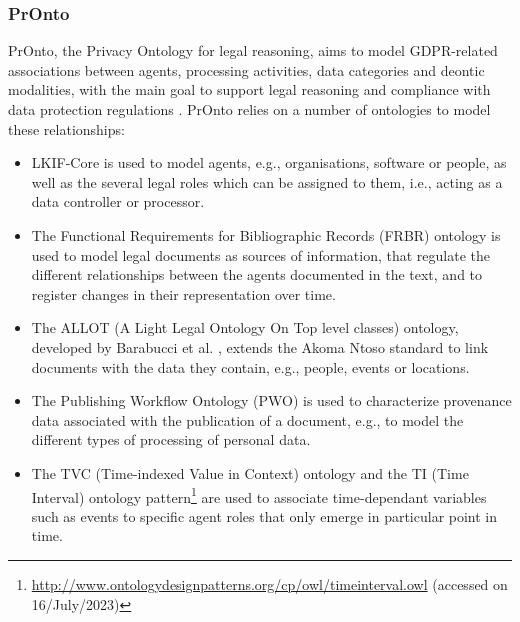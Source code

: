 \subsubsection{PrOnto}
\label{sec:pronto}

PrOnto, the Privacy Ontology for legal reasoning, aims to model GDPR-related associations between agents, processing activities, data categories and deontic modalities, with the main goal to support legal reasoning and compliance with data protection regulations \citep{ko_pronto_2018}.
PrOnto relies on a number of ontologies to model these relationships:
\begin{itemize}
    \item LKIF-Core \citep{hoekstra_lkif_2007} is used to model agents, e.g., organisations, software or people, as well as the several legal roles which can be assigned to them, i.e., acting as a data controller or processor.
    \item The Functional Requirements for Bibliographic Records (FRBR) ontology \citep{byrum_functional_2009} is used to model legal documents as sources of information, that regulate the different relationships between the agents documented in the text, and to register changes in their representation over time. %
    \item The ALLOT (A Light Legal Ontology On Top level classes) ontology, developed by Barabucci et al. \citep{barabucci_managing_2010}, extends the Akoma Ntoso standard \citep{palmirani_akoma-ntoso_2011} to link documents with the data they contain, e.g., people, events or locations.
    \item The Publishing Workflow Ontology (PWO) \citep{gangemi_publishing_2017} is used to characterize provenance data associated with the publication of a document, e.g., to model the different types of processing of personal data.
    \item The TVC (Time-indexed Value in Context) ontology \citep{peroni_semantic_2014} and the TI (Time Interval) ontology pattern\footnote{\url{http://www.ontologydesignpatterns.org/cp/owl/timeinterval.owl} (accessed on 16/July/2023)} are used to associate time-dependant variables such as events to specific agent roles that only emerge in particular point in time.
\end{itemize}

